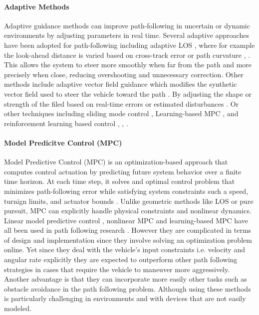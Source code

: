 \paragraph*{Adaptive Methods}
Adaptive guidance methods can improve path-following in uncertain or dynamic environments by adjusting parameters in real time. Several adaptive approaches have been adopted for path-following including adaptive LOS \cite{fossen_direct_2017}, where for example the look-ahead distance is varied based on cross-track error \cite{lekkas_integral_2014} or path curvature \cite{liu_path_2017}, \cite{hung_review_2023}. This allows the system to steer more smoothly when far from the path and more precisely when close, reducing overshooting and unnecessary correction.
\newline \newline 
Other methods include adaptive vector field guidance which modifies the synthetic vector field used to steer the vehicle toward the path \cite{wang_adaptive_2022} \cite{wang_adaptive_2022}. By adjusting the shape or strength of the filed based on real-time errors or estimated disturbances \cite{soetanto_adaptive_2003}. Or other techniques including sliding mode control \cite{soetanto_adaptive_2003} \cite{dagci_path_2003}, Learning-based MPC \cite{noauthor_learningbased_nodate}, \cite{rokonuzzaman_effective_2023} and reinforcement learning based control \cite{wang_path_2024}, \cite{martinsen_reinforcement_2020}, \cite{hung_review_2023}.

\paragraph*{Model Predicitve Control (MPC)}
Model Predictive Control (MPC) is an optimization-based approach that computes control actuation by predicting future system behavior over a finite time horizon. At each time step, it solves and optimal control problem that minimizes path-following error while satisfying system constraints such a speed, turnign limits, and actuator bounds \cite{hung_review_2023}. 
\newline \newline
Unlike geometric methods like LOS or pure pursuit, MPC can explicitly handle physical constraints and nonlinear dynamics. Linear model predictive control \cite{kanjanawanishkul_mpc-based_2015}, nonlinear MPC \cite{guo_model_2019} \cite{xu_model_2021} and learning-based MPC have all been used in path following research \cite{hung_review_2023}. However they are complicated in terms of design and implementation since they involve solving an optimization problem online. Yet since they deal with the vehicle's input constraints i.e. velocity and angular rate explicitly they are  expected to outperform other path following strategies in cases that require the vehicle to maneuver more aggressively. Another advantage is that they can incorporate more easily other tasks such as obstacle avoidance in the path following problem. Although using these methods is particularly challenging in environments and with devices that are not easily modeled.

